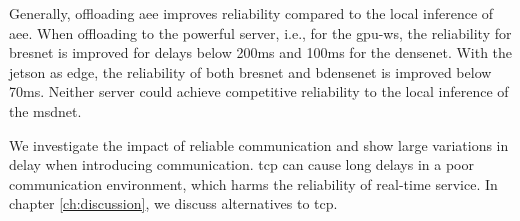Generally, offloading \gls{aee} improves reliability compared to the local inference of \gls{aee}. When offloading to the powerful server, i.e., for the \gls{gpu-ws}, the reliability for \gls{bresnet} is improved for delays below 200ms and 100ms for the \gls{densenet}. With the \gls{jetson} as edge, the reliability of both \gls{bresnet} and \gls{bdensenet} is improved below 70ms. Neither server could achieve competitive reliability to the local inference of the \gls{msdnet}.

We investigate the impact of reliable communication and show large variations in delay when introducing communication. \gls{tcp} can cause long delays in a poor communication environment, which harms the reliability of real-time service. In chapter \ref{ch:discussion}, we discuss alternatives to \gls{tcp}.




